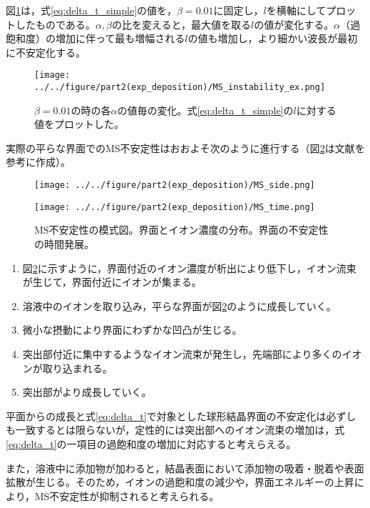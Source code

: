 \documentclass[autodetect-engine,dvi=dvipdfmx,a4paper,ja=standard,oneside,openany,11pt]{bxjsbook}
\begin{document}
図\ref{fig:MS_instability_ex}は，式\eqref{eq:delta_t_simple}の値を，$\beta=0.01$に固定し，$l$を横軸にしてプロットしたものである。$\alpha,\beta$の比を変えると，最大値を取る$l$の値が変化する。$\alpha$（過飽和度）の増加に伴って最も増幅される$l$の値も増加し，より細かい波長が最初に不安定化する。

\begin{figure}[htbp]
  \centering
  \texttt{[image: ../../figure/part2(exp\_deposition)/MS\_instability\_ex.png]}
  \caption{$\beta=0.01$の時の各$\alpha$の値毎の変化。式\eqref{eq:delta_t_simple}の$l$に対する値をプロットした。}
  \label{fig:MS_instability_ex}
\end{figure}

実際の平らな界面でのMS不安定性はおおよそ次のように進行する（図\ref{fig:MS}は文献\cite{結晶成長}を参考に作成）。

\begin{figure}[htbp]
  \begin{minipage}
    {0.5\textwidth}
    \subcaption{}
    \centering
    \texttt{[image: ../../figure/part2(exp\_deposition)/MS\_side.png]}
    \label{fig:MS_side}
  \end{minipage}
  \begin{minipage}
    {0.5\textwidth}
    \subcaption{}
    \centering
    \texttt{[image: ../../figure/part2(exp\_deposition)/MS\_time.png]}
    \label{fig:MS_top}
  \end{minipage}
  \caption{MS不安定性の模式図。界面とイオン濃度の分布。界面の不安定性の時間発展。}
  \label{fig:MS}
\end{figure}

\begin{enumerate}
  \item 図\ref{fig:MS}に示すように，界面付近のイオン濃度が析出により低下し，イオン流束が生じて，界面付近にイオンが集まる。
  \item 溶液中のイオンを取り込み，平らな界面が図\ref{fig:MS}のように成長していく。
  \item 微小な摂動により界面にわずかな凹凸が生じる。
  \item 突出部付近に集中するようなイオン流束が発生し，先端部により多くのイオンが取り込まれる。
  \item 突出部がより成長していく。
\end{enumerate}
平面からの成長と式\eqref{eq:delta_t}で対象とした球形結晶界面の不安定化は必ずしも一致するとは限らないが，定性的には突出部へのイオン流束の増加は，式\eqref{eq:delta_t}の一項目の過飽和度の増加に対応すると考えらえる。

また，溶液中に添加物が加わると，結晶表面において添加物の吸着・脱着や表面拡散が生じる。そのため，イオンの過飽和度の減少や，界面エネルギーの上昇により，MS不安定性が抑制されると考えられる。

\ifdraft{
  
  
}{}
\end{document}
